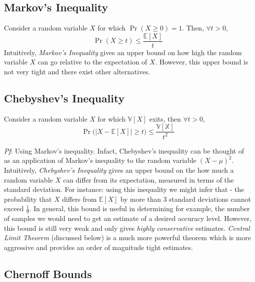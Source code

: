 \documentclass[english, 11pt]{article}
\begin{document}
\subsection{Markov's Inequality}
Consider a random variable $X$ for which $\Pr(X \ge 0) = 1$. Then, $\forall t > 0$,
\[ \Pr(X \ge t) \le \frac{\mathbb{E}[X]}{t} \]
Intuitively, {\it Markov's Inequality} gives an upper bound on how high the random variable $X$ can go relative to the expectation of $X$. However, this upper bound is not very tight and there exist other alternatives.

\subsection{Chebyshev's Inequality}
Consider a random variable $X$ for which $\mathbb{V}[X]$ exits, then $\forall t > 0$,
\[ \Pr \bigg( \big| X - \mathbb{E}[X] \big| \ge t \bigg) \le \frac{\mathbb{V[X]}}{t^2} \]

{\it Pf}: Using Markov's inequality. Infact, Chebyshev's inequality can be thought of as an application of Markov's inequality to the random variable $(X - \mu)^2$.\\

Intuitively, {\it Chebyshev's Inequality} gives an upper bound on the how much a random variable $X$ can differ from its expectation, measured in terms of the standard deviation. For instance: using this inequality we might infer that - the probability that $X$ differs from $\mathbb{E}[X]$ by more than 3 standard deviations cannot exceed $\frac{1}{9}$. In general, this bound is useful in determining for example, the number of samples we would need to get an estimate of a desired accuracy level. However, this bound is still very weak and only gives {\it highly conservative} estimates. {\it Central Limit Theorem} (discussed below) is a much more powerful theorem which is more aggressive and provides an order of magnitude tight estimates.\\

\subsection{Chernoff Bounds}
\end{document}
